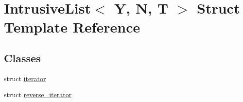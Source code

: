 \hypertarget{structIntrusiveList}{}\section{Intrusive\+List$<$ Y, N, T $>$ Struct Template Reference}
\label{structIntrusiveList}
\subsection*{Classes}
\begin{DoxyCompactItemize}
\item 
struct \hyperlink{structIntrusiveList_1_1iterator}{iterator}
\item 
struct \hyperlink{structIntrusiveList_1_1reverse__iterator}{reverse\+\_\+iterator}
\end{DoxyCompactItemize}
